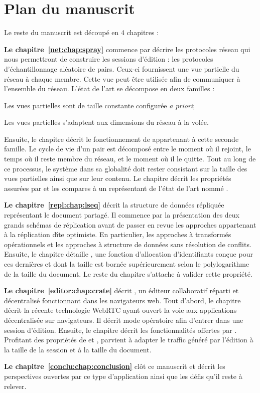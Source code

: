 
\section{Plan du manuscrit}

Le reste du manuscrit est découpé en 4 chapitres :


\textbf{Le chapitre~\ref{net:chap:spray}} commence par décrire les protocoles
réseau qui nous permettront de construire les sessions d'édition : les
protocoles d'échantillonnage aléatoire de pairs. Ceux-ci fournissent une vue
partielle du réseau à chaque membre. Cette vue peut être utilisée afin de
communiquer à l'ensemble du réseau. L'état de l'art se décompose en deux
familles :
\begin{inparaenum}[(i)]
\item Les vues partielles sont de taille constante configurée \emph{a priori};
\item Les vues partielles s'adaptent aux dimensions du réseau à la volée.
\end{inparaenum}
Ensuite, le chapitre décrit le fonctionnement de \SPRAY appartenant à cette
seconde famille. Le cycle de vie d'un pair est décomposé entre le moment où il
rejoint, le temps où il reste membre du réseau, et le moment où il le
quitte. Tout au long de ce processus, le système dans sa globalité doit rester
consistant sur la taille des vues partielles ainsi que sur leur contenu.  Le
chapitre décrit les propriétés assurées par \SPRAY et les compares à un
représentant de l'état de l'art nommé \CYCLON.

\textbf{Le chapitre~\ref{repl:chap:lseq}} décrit la structure de données
répliquée représentant le document partagé. Il commence par la présentation des
deux grands schémas de réplication avant de passer en revue les approches
appartenant à la réplication dîte optimiste. En particulier, les approches à
transformés opérationnels et les approches à structure de données sans
résolution de conflits. Ensuite, le chapitre détaille \LSEQ, une fonction
d'allocation d'identifiants conçue pour ces dernières et dont la taille est
bornée supérieurement selon le polylogarithme de la taille du document. Le reste
du chapitre s'attache à valider cette propriété.

\textbf{Le chapitre~\ref{editor:chap:crate}} décrit \CRATE, un éditeur
collaboratif réparti et décentralisé fonctionnant dans les navigateurs web.
Tout d'abord, le chapitre décrit la récente technologie WebRTC ayant ouvert la
voie aux applications décentralisée sur navigateurs. Il décrit mode opératoire
afin d'entrer dans une session d'édition. Ensuite, le chapitre décrit les
fonctionnalités offertes par \CRATE.  Profitant des propriétés de \SPRAY et
\LSEQ, \CRATE parvient à adapter le traffic généré par l'édition à la taille de
la session et à la taille du document.

\textbf{Le chapitre~\ref{conclu:chap:conclusion}} clôt ce manuscrit et décrit
les perspectives ouvertes par ce type d'application ainsi que les défis qu'il
reste à relever.


